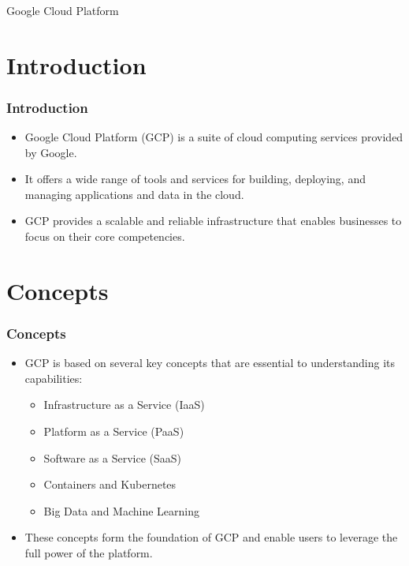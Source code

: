 \begin{frame}[fragile]\frametitle{}
\begin{center}
{\Large Google Cloud Platform}
\end{center}
\end{frame}

\section{Introduction}

\begin{frame}[fragile]\frametitle{Introduction}
  \begin{itemize}
    \item Google Cloud Platform (GCP) is a suite of cloud computing services provided by Google.
    \item It offers a wide range of tools and services for building, deploying, and managing applications and data in the cloud.
    \item GCP provides a scalable and reliable infrastructure that enables businesses to focus on their core competencies.
  \end{itemize}
\end{frame}

\section{Concepts}

\begin{frame}[fragile]\frametitle{Concepts}
  \begin{itemize}
    \item GCP is based on several key concepts that are essential to understanding its capabilities:
      \begin{itemize}
        \item Infrastructure as a Service (IaaS)
        \item Platform as a Service (PaaS)
        \item Software as a Service (SaaS)
        \item Containers and Kubernetes
        \item Big Data and Machine Learning
      \end{itemize}
    \item These concepts form the foundation of GCP and enable users to leverage the full power of the platform.
  \end{itemize}
\end{frame}

